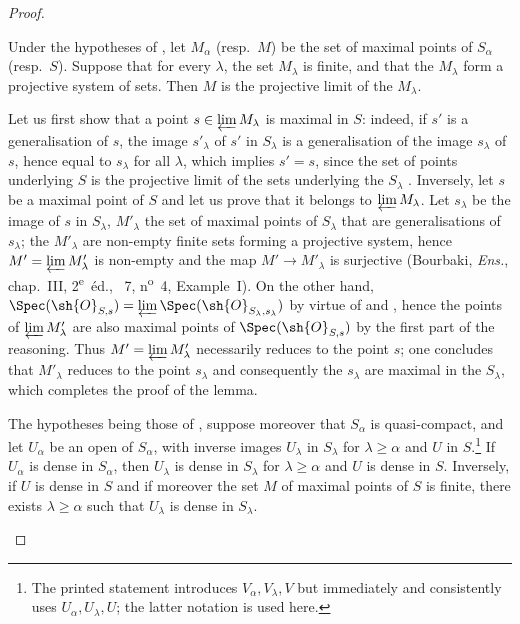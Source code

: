 \begin{proof}
\begin{lemma}[20.3.8.3]
\label{IV.20.3.8.3}
Under the hypotheses of , let $M_\alpha$ (resp.\ $M$) be the set of maximal points of $S_\alpha$ (resp.\ $S$).
Suppose that for every $\lambda$, the set $M_\lambda$ is finite, and that the $M_\lambda$ form a projective system of sets.
Then $M$ is the projective limit of the $M_\lambda$.
\end{lemma}

Let us first show that a point $s\in\varprojlim M_\lambda$ is maximal in $S$: indeed, if $s'$ is a generalisation of $s$, the image $s'_\lambda$ of $s'$ in $S_\lambda$ is a generalisation of the image $s_\lambda$ of $s$, hence equal to $s_\lambda$ for all $\lambda$, which implies $s'=s$, since the set of points underlying $S$ is the projective limit of the sets underlying the $S_\lambda$ .
Inversely, let $s$ be a maximal point of $S$ and let us prove that it belongs to $\varprojlim M_\lambda$.
Let $s_\lambda$ be the image of $s$ in $S_\lambda$, $M'_\lambda$ the set of maximal points of $S_\lambda$ that are generalisations of $s_\lambda$; the $M'_\lambda$ are non-empty finite sets forming a projective system, hence $M'=\varprojlim M'_\lambda$ is non-empty and the map $M'\to M'_\lambda$ is surjective (Bourbaki, \emph{Ens.}, chap.~III, 2\textsuperscript{e}~\'ed., \textsection~7, n\textsuperscript{o}~4, Example~I).
On the other hand, $\Spec(\sh{O}_{S,s})=\varprojlim\Spec(\sh{O}_{S_\lambda,s_\lambda})$ by virtue of  and , hence the points of $\varprojlim M'_\lambda$ are also maximal points of $\Spec(\sh{O}_{S,s})$ by the first part of the reasoning.
Thus $M'=\varprojlim M'_\lambda$ necessarily reduces to the point $s$; one concludes that $M'_\lambda$ reduces to the point $s_\lambda$ and consequently the $s_\lambda$ are maximal in the $S_\lambda$, which completes the proof of the lemma.

\begin{lemma}[20.3.8.4]
\label{IV.20.3.8.4}
The hypotheses being those of , suppose moreover that $S_\alpha$ is quasi-compact, and let $U_\alpha$ be an open of $S_\alpha$, with inverse images $U_\lambda$ in $S_\lambda$ for $\lambda\geq\alpha$ and $U$ in $S$.\footnote{The printed statement introduces $V_\alpha,V_\lambda,V$ but immediately and consistently uses $U_\alpha,U_\lambda,U$; the latter notation is used here.}
If $U_\alpha$ is dense in $S_\alpha$, then $U_\lambda$ is dense in $S_\lambda$ for $\lambda\geq\alpha$ and $U$ is dense in $S$.
Inversely, if $U$ is dense in $S$ and if moreover the set $M$ of maximal points of $S$ is finite, there exists $\lambda\geq\alpha$ such that $U_\lambda$ is dense in $S_\lambda$.
\end{lemma}


\end{proof}
